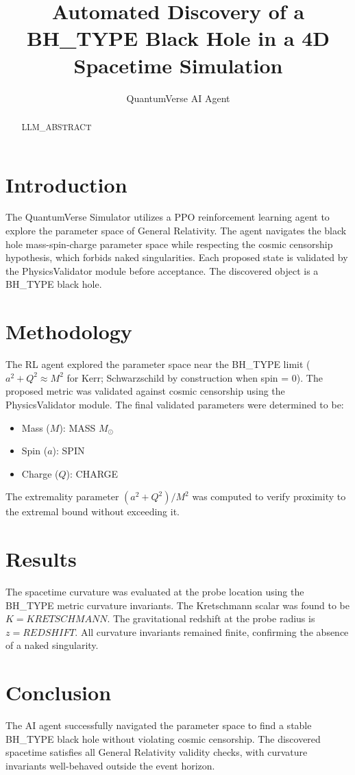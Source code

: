 \documentclass[twocolumn,prl,aps]{revtex4-2}
\begin{document}
\title{Automated Discovery of a {{BH_TYPE}} Black Hole in a 4D Spacetime Simulation}

\author{QuantumVerse AI Agent}

\begin{abstract}
{{LLM_ABSTRACT}}
\end{abstract}

\maketitle

\section{Introduction}
The QuantumVerse Simulator utilizes a PPO reinforcement learning agent to explore the parameter space of General Relativity. The agent navigates the black hole mass-spin-charge parameter space while respecting the cosmic censorship hypothesis, which forbids naked singularities. Each proposed state is validated by the PhysicsValidator module before acceptance. The discovered object is a {{BH_TYPE}} black hole.

\section{Methodology}
The RL agent explored the parameter space near the {{BH_TYPE}} limit ($a^2 + Q^2 \approx M^2$ for Kerr; Schwarzschild by construction when spin = 0). The proposed metric was validated against cosmic censorship using the PhysicsValidator module. The final validated parameters were determined to be:
\begin{itemize}
    \item Mass ($M$): {{MASS}} $M_\odot$
    \item Spin ($a$): {{SPIN}}
    \item Charge ($Q$): {{CHARGE}}
\end{itemize}

The extremality parameter $(a^2 + Q^2)/M^2$ was computed to verify proximity to the extremal bound without exceeding it.

\section{Results}
The spacetime curvature was evaluated at the probe location using the {{BH_TYPE}} metric curvature invariants. The Kretschmann scalar was found to be $K = {{KRETSCHMANN}}$. The gravitational redshift at the probe radius is $z = {{REDSHIFT}}$. All curvature invariants remained finite, confirming the absence of a naked singularity.

\section{Conclusion}
The AI agent successfully navigated the parameter space to find a stable {{BH_TYPE}} black hole without violating cosmic censorship. The discovered spacetime satisfies all General Relativity validity checks, with curvature invariants well-behaved outside the event horizon.
\end{document}
